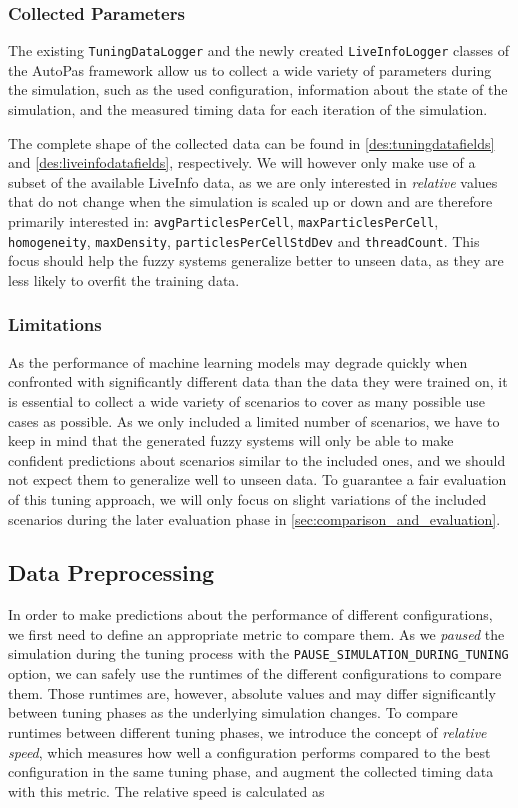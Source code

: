 \subsubsection{Collected Parameters}

The existing \texttt{TuningDataLogger} and the newly created \texttt{LiveInfoLogger} classes of the AutoPas framework allow us to collect a wide variety of parameters during the simulation, such as the used configuration, information about the state of the simulation, and the measured timing data for each iteration of the simulation.

The complete shape of the collected data can be found in \autoref{des:tuningdatafields} and \autoref{des:liveinfodatafields}, respectively. We will however only make use of a subset of the available LiveInfo data, as we are only interested in \emph{relative} values that do not change when the simulation is scaled up or down and are therefore primarily interested in: \texttt{avgParticlesPerCell}, \texttt{maxParticlesPerCell}, \texttt{homogeneity}, \texttt{maxDensity}, \texttt{particlesPerCellStdDev} and \texttt{threadCount}. This focus should help the fuzzy systems generalize better to unseen data, as they are less likely to overfit the training data.


\subsubsection{Limitations}

As the performance of machine learning models may degrade quickly when confronted with significantly different data than the data they were trained on, it is essential to collect a wide variety of scenarios to cover as many possible use cases as possible. As we only included a limited number of scenarios, we have to keep in mind that the generated fuzzy systems will only be able to make confident predictions about scenarios similar to the included ones, and we should not expect them to generalize well to unseen data.
To guarantee a fair evaluation of this tuning approach, we will only focus on slight variations of the included scenarios during the later evaluation phase in \autoref{sec:comparison_and_evaluation}.

\subsection{Data Preprocessing}

In order to make predictions about the performance of different configurations, we first need to define an appropriate metric to compare them. As we \emph{paused} the simulation during the tuning process with the \texttt{PAUSE\_SIMULATION\_DURING\_TUNING} option, we can safely use the runtimes of the different configurations to compare them. Those runtimes are, however, absolute values and may differ significantly between tuning phases as the underlying simulation changes. To compare runtimes between different tuning phases, we introduce the concept of \emph{relative speed}, which measures how well a configuration performs compared to the best configuration in the same tuning phase, and augment the collected timing data with this metric. The relative speed is calculated as


